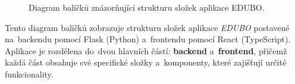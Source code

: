 \documentclass[male,czech,api_bc]{kitheses}
\begin{document}
\begin{figure}[H]
	\centering
	\caption{Diagram balíčků znázorňující strukturu složek aplikace EDUBO.}
	\label{fig:package-diagram-1}
\end{figure}

Tento diagram balíčků zobrazuje strukturu složek aplikace \textit{EDUBO} postavené na~backendu pomocí Flask (Python) a~frontendu pomocí React (TypeScript). Aplikace je rozdělena do~dvou hlavních částí: \textbf{backend} a~\textbf{frontend}, přičemž každá část obsahuje své specifické složky a~komponenty, které zajišťují určité funkcionality.
\end{document}
